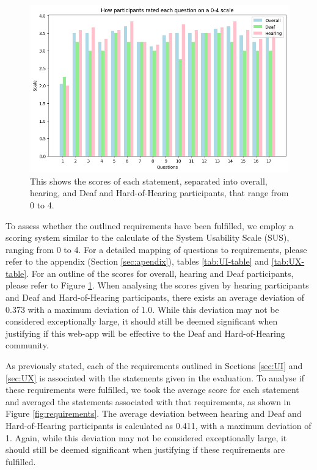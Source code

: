 \documentclass{l4proj}
\begin{document}
\begin{figure}
    \centering
    \includegraphics[width=0.75\linewidth]{dissertation/images/questions.png}    
    \caption{This shows the scores of each statement, separated into overall, hearing, and Deaf and Hard-of-Hearing participants, that range from 0 to 4.}
    \label{fig:questions}
\end{figure}


To assess whether the outlined requirements have been fulfilled, we employ a scoring system similar to the calculate of the System Usability Scale (SUS), ranging from 0 to 4. For a detailed mapping of questions to requirements, please refer to the appendix (Section \ref{sec:apendix}), tables \ref{tab:UI-table} and \ref{tab:UX-table}. For an outline of the scores for overall, hearing and Deaf participants, please refer to Figure \ref{fig:questions}. When analysing the scores given by hearing participants and Deaf and Hard-of-Hearing participants, there exists an average deviation of 0.373 with a maximum deviation of 1.0. While this deviation may not be considered exceptionally large, it should still be deemed significant when justifying if this web-app will be effective to the Deaf and Hard-of-Hearing community.


As previously stated, each of the requirements outlined in Sections \ref{sec:UI} and \ref{sec:UX} is associated with the statements given in the evaluation. To analyse if these requirements were fulfilled, we took the average score for each statement and averaged the statements associated with that requirements, as shown in Figure \ref{fig:requirements}. The average deviation between hearing and Deaf and Hard-of-Hearing participants is calculated as 0.411, with a maximum deviation of 1. Again, while this deviation may not be considered exceptionally large, it should still be deemed significant when justifying if these requirements are fulfilled.
\end{document}
